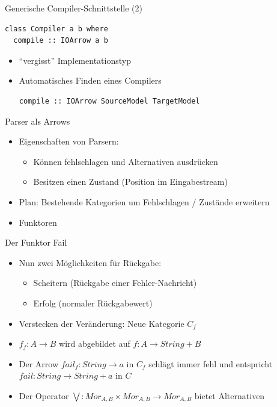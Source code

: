 \documentclass{beamer}
\newcommand{\pfeil}{\item[$\Rightarrow$]}
\begin{document}
\begin{frame}[fragile]{Generische Compiler-Schnittstelle (2)}
\begin{verbatim}
class Compiler a b where
  compile :: IOArrow a b
\end{verbatim}
\begin{itemize}
\item ``vergisst'' Implementationstyp
\item Automatisches Finden eines Compilers
\begin{verbatim}
compile :: IOArrow SourceModel TargetModel
\end{verbatim}
\end{itemize}
\end{frame}

\begin{frame}{Parser als Arrows}
  \begin{itemize}
  \item Eigenschaften von Parsern:
    \begin{itemize}
    \item Können fehlschlagen und Alternativen ausdrücken
    \item Besitzen einen Zustand (Position im Eingabestream)
    \end{itemize}
  \item Plan: Bestehende Kategorien um Fehlschlagen / Zustände erweitern
  \pfeil Funktoren
  \end{itemize}
\end{frame}

\begin{frame}{Der Funktor Fail}
  \begin{itemize}
  \item Nun zwei Möglichkeiten für Rückgabe:
    \begin{itemize}
    \item Scheitern (Rückgabe einer Fehler-Nachricht)
    \item Erfolg (normaler Rückgabewert)
    \end{itemize}
  \item Verstecken der Veränderung: Neue Kategorie $C_{f}$
  \item $f_{f} : A \rightarrow B$ wird abgebildet auf
    $f : A \rightarrow String + B$
  \item Der Arrow $fail_{f} : String \rightarrow a$ in $C_{f}$ schlägt immer
    fehl und entspricht $fail : String \rightarrow String + a$ in $C$
  \item Der Operator $\bigvee : Mor_{A,B} \times Mor_{A,B} \rightarrow
    Mor_{A,B} $ bietet Alternativen
  \end{itemize}
\end{frame}
\end{document}
